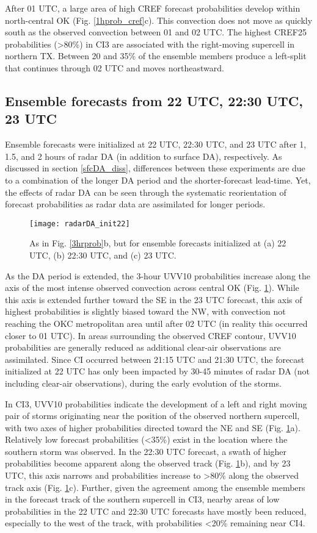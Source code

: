 After 01 UTC, a large area of high CREF forecast probabilities develop within north-central OK (Fig. \ref{1hprob_cref}c). This convection does not move as quickly south as the observed convection between 01 and 02 UTC. The highest CREF25 probabilities (\textgreater 80\%) in CI3 are associated with the right-moving supercell in northern TX. Between 20 and 35\% of the ensemble members produce a left-split that continues through 02 UTC and moves northeastward.

\subsection{Ensemble forecasts from 22 UTC, 22:30 UTC, 23 UTC}
Ensemble forecasts were initialized at 22 UTC, 22:30 UTC, and 23 UTC after 1, 1.5, and 2 hours of radar DA (in addition to surface DA), respectively. As discussed in section \ref{sfcDA_diss}, differences between these experiments are due to a combination of the longer DA period and the shorter-forecast lead-time. Yet, the effects of radar DA can be seen through the systematic reorientation of forecast probabilities as radar data are assimilated for longer periods.

\begin{figure}
\centering
\texttt{[image: radarDA\_init22]}
\caption{As in Fig. \ref{3hrprob}b, but for ensemble forecasts initialized at (a) 22 UTC, (b) 22:30 UTC, and (c) 23 UTC.}
\label{init22}
\end{figure}

As the DA period is extended, the 3-hour UVV10 probabilities increase along the axis of the most intense observed convection across central OK (Fig. \ref{init22}). While this axis is extended further toward the SE in the 23 UTC forecast, this axis of highest probabilities is slightly biased toward the NW, with convection not reaching the OKC metropolitan area until after 02 UTC (in reality this occurred closer to 01 UTC). In areas surrounding the observed CREF contour, UVV10 probabilities are generally reduced as additional clear-air observations are assimilated. Since CI occurred between 21:15 UTC and 21:30 UTC, the forecast initialized at 22 UTC has only been impacted by 30-45 minutes of radar DA (not including clear-air observations), during the early evolution of the storms.

In CI3, UVV10 probabilities indicate the development of a left and right moving pair of storms originating near the position of the observed northern supercell, with two axes of higher probabilities directed toward the NE and SE (Fig. \ref{init22}a). Relatively low forecast probabilities (\textless 35\%) exist in the location where the southern storm was observed. In the 22:30 UTC forecast, a swath of higher probabilities become apparent along the observed track (Fig. \ref{init22}b), and by 23 UTC, this axis narrows and probabilities increase to \textgreater 80\% along the observed track axis (Fig. \ref{init22}c). Further, given the agreement among the ensemble members in the forecast track of the southern supercell in CI3, nearby areas of low probabilities in the 22 UTC and 22:30 UTC forecasts have mostly been reduced, especially to the west of the track, with probabilities \textless 20\% remaining near CI4.

